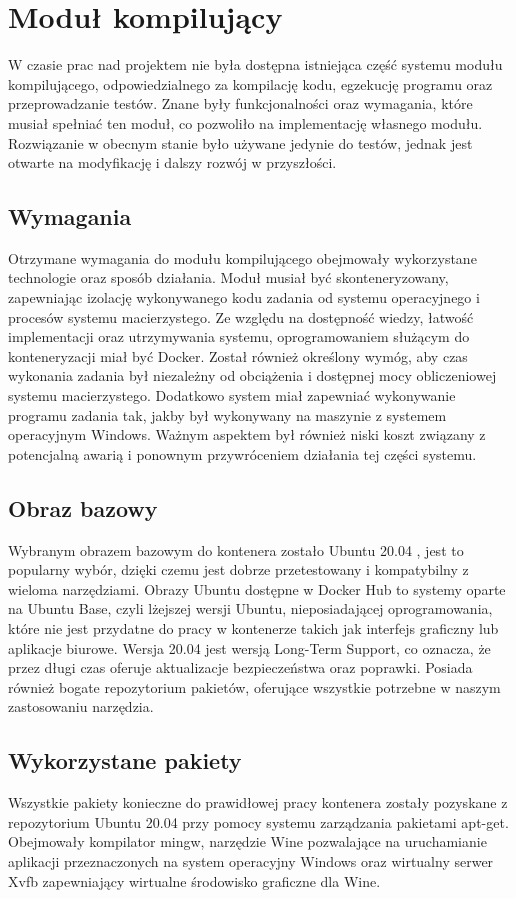 \section{Moduł kompilujący}
W czasie prac nad projektem nie była dostępna istniejąca część systemu modułu kompilującego, odpowiedzialnego za kompilację kodu, egzekucję programu oraz przeprowadzanie testów. Znane były funkcjonalności oraz wymagania, które musiał spełniać ten moduł, co pozwoliło na implementację własnego modułu. Rozwiązanie w obecnym stanie było używane jedynie do testów, jednak jest otwarte na modyfikację i dalszy rozwój w przyszłości.

\subsection{Wymagania}
Otrzymane wymagania do modułu kompilującego obejmowały wykorzystane technologie oraz sposób działania. Moduł musiał być skonteneryzowany, zapewniając izolację wykonywanego kodu zadania od systemu operacyjnego i procesów systemu macierzystego. Ze względu na dostępność wiedzy, łatwość implementacji oraz utrzymywania systemu, oprogramowaniem służącym do konteneryzacji miał być Docker. Został również określony wymóg, aby czas wykonania zadania był niezależny od obciążenia i dostępnej mocy obliczeniowej systemu macierzystego. Dodatkowo system miał zapewniać wykonywanie programu zadania tak, jakby był wykonywany na maszynie z systemem operacyjnym Windows. Ważnym aspektem był również niski koszt związany z potencjalną awarią i ponownym przywróceniem działania tej części systemu.

\subsection{Obraz bazowy}
Wybranym obrazem bazowym do kontenera zostało Ubuntu 20.04 \cite{linuxUbuntu}, jest to popularny wybór, dzięki czemu jest dobrze przetestowany i kompatybilny z wieloma narzędziami. Obrazy Ubuntu dostępne w Docker Hub to systemy oparte na Ubuntu Base, czyli lżejszej wersji Ubuntu, nieposiadającej oprogramowania, które nie jest przydatne do pracy w kontenerze takich jak interfejs graficzny lub aplikacje biurowe. Wersja 20.04 jest wersją Long-Term Support, co oznacza, że przez długi czas oferuje aktualizacje bezpieczeństwa oraz poprawki. Posiada również bogate repozytorium pakietów, oferujące wszystkie potrzebne w naszym zastosowaniu narzędzia.

\subsection{Wykorzystane pakiety}
Wszystkie pakiety konieczne do prawidłowej pracy kontenera zostały pozyskane z repozytorium Ubuntu 20.04 przy pomocy systemu zarządzania pakietami apt-get. Obejmowały kompilator mingw, narzędzie Wine pozwalające na uruchamianie aplikacji przeznaczonych na system operacyjny Windows oraz wirtualny serwer Xvfb zapewniający wirtualne środowisko graficzne dla Wine.

